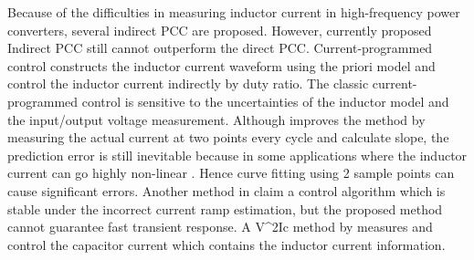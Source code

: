 Because of the difficulties in measuring inductor current in high-frequency power converters, several indirect PCC are proposed. However, currently proposed Indirect PCC  still cannot outperform the direct PCC.
Current-programmed control constructs the inductor current waveform using the priori model and control the inductor current indirectly by duty ratio.
The classic current-programmed control \cite{Chendragan2003} is sensitive to the uncertainties of the inductor model and the input/output voltage measurement. Although \cite{Taeed2014} improves the method by measuring the actual current at two points every cycle and calculate slope, the prediction error is still inevitable because in some applications where the inductor current can go highly non-linear \cite{Ahsanuzzamanprodic2012apec} \cite{DiCapua2016}. Hence curve fitting using 2 sample points can cause significant errors. Another method in \cite{Chattopadhyay2006} claim a control algorithm which is stable under the incorrect current ramp estimation, but the proposed method cannot guarantee fast transient response.
A V^2Ic method by \cite{Huerta2013} measures and control the capacitor current which contains the inductor current information.